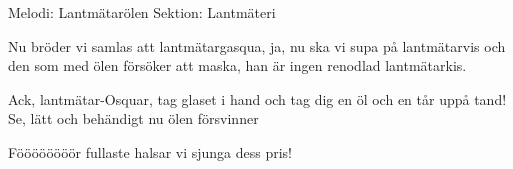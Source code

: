 \begin{song}

\begin{songmeta}
Melodi: Lantmätarölen
Sektion: Lantmäteri
\end{songmeta}

\begin{songtext}
Nu bröder vi samlas att lantmätargasqua,
ja, nu ska vi supa på lantmätarvis
och den som med ölen försöker att maska,
han är ingen renodlad lantmätarkis.

Ack, lantmätar-Osquar, tag glaset i hand
och tag dig en öl och en tår uppå tand!
Se, lätt och behändigt nu ölen försvinner

Föööööööör fullaste halsar vi sjunga dess pris!
\end{songtext}
\end{song}
